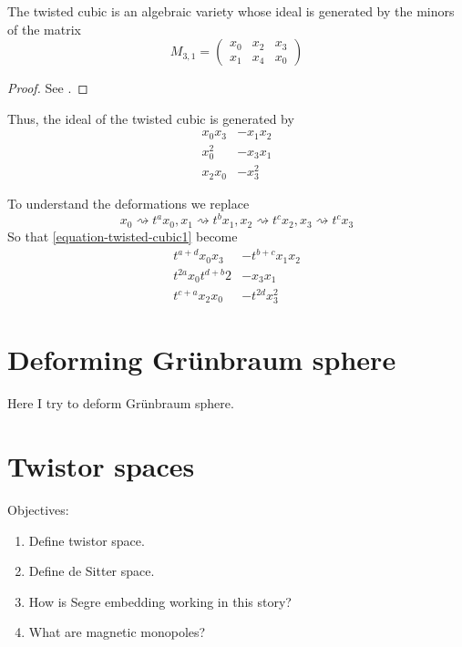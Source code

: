 \begin{lemma}
\label{lemma-twisted-cubic-is-variety}
\begin{reference}
\cite[Proposition 6.1]{sys}
\end{reference}
The twisted cubic is an algebraic variety whose ideal is generated by the minors
of the matrix
$$
M_{3,1}=\begin{pmatrix}
x_0 & x_2 & x_3\\
x_1 & x_4 & x_0
\end{pmatrix}
$$
\end{lemma}

\begin{proof}
See \cite[Proposition 6.1]{sys}.
\end{proof}

Thus, the ideal of the twisted cubic is generated by
\begin{align}
\label{equation-twisted-cubic1}
x_0x_3&-x_1x_2\\
x_0^2&-x_3x_1\\
x_2x_0&-x_3^2
\end{align}

To understand the deformations we replace
$$
x_0\rightsquigarrow t^ax_0,x_1\rightsquigarrow t^bx_1,
x_2\rightsquigarrow t^cx_2,x_3\rightsquigarrow t^cx_3
$$
So that \ref{equation-twisted-cubic1} become
\begin{align}
\label{equation-twisted-cubic2}
t^{a+d}x_0x_3&-t^{b+c}x_1x_2\\
t^{2a}x_0t^{d+b}2&-x_3x_1\\
t^{c+a}x_2x_0&-t^{2d}x_3^2
\end{align}

\section{Deforming Grünbraum sphere}
\label{section-grunbaum-sphere}

Here I try to deform Grünbraum sphere.

\section{Twistor spaces}
\label{section-twistor-spaces}

Objectives:
\begin{enumerate}
\item Define twistor space.
\item Define de Sitter space.
\item How is Segre embedding working in this story?
\item What are magnetic monopoles?
\end{enumerate}

